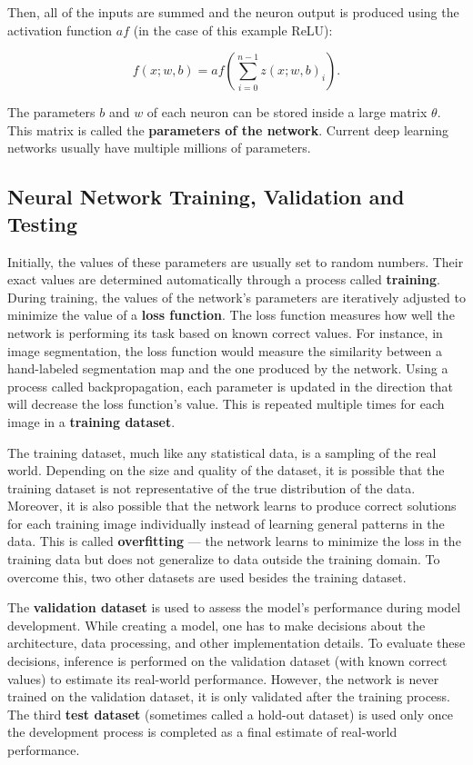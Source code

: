 Then, all of the inputs are summed and the neuron output is produced using the activation function $af$ (in the case of this example ReLU):

\begin{equation}
f(x;w,b) = af\left(\sum_{i=0}^{n - 1} z(x;w,b)_i\right).
\end{equation}

The parameters $b$ and $w$ of each neuron can be stored inside a large matrix $\theta$. This matrix is called the \textbf{parameters of the network}. Current deep learning networks usually have multiple millions of parameters.

\subsection{Neural Network Training, Validation and Testing}

Initially, the values of these parameters are usually set to random numbers. Their exact values are determined automatically through a process called \textbf{training}. During training, the values of the network's parameters are iteratively adjusted to minimize the value of a \textbf{loss function}. The loss function measures how well the network is performing its task based on known correct values. For instance, in image segmentation, the loss function would measure the similarity between a hand-labeled segmentation map and the one produced by the network. Using a process called backpropagation, each parameter is updated in the direction that will decrease the loss function's value. This is repeated multiple times for each image in a \textbf{training dataset}.

The training dataset, much like any statistical data, is a sampling of the real world. Depending on the size and quality of the dataset, it is possible that the training dataset is not representative of the true distribution of the data. Moreover, it is also possible that the network learns to produce correct solutions for each training image individually instead of learning general patterns in the data. This is called \textbf{overfitting} --- the network learns to minimize the loss in the training data but does not generalize to data outside the training domain. To overcome this, two other datasets are used besides the training dataset.

The \textbf{validation dataset} is used to assess the model's performance during model development. While creating a model, one has to make decisions about the architecture, data processing, and other implementation details. To evaluate these decisions, inference is performed on the validation dataset (with known correct values) to estimate its real-world performance. However, the network is never trained on the validation dataset, it is only validated after the training process. The third \textbf{test dataset} (sometimes called a hold-out dataset) is used only once the development process is completed as a final estimate of real-world performance.

